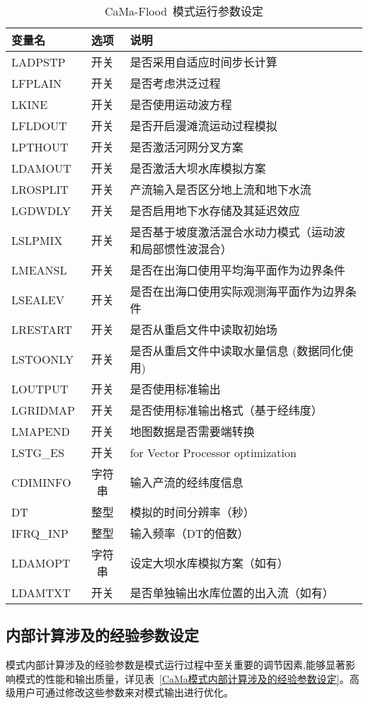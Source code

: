 \documentclass[a4paper,12pt,twoside]{article}
\begin{document}
\begin{table}[htbp]
\caption{CaMa-Flood~模式运行参数设定}
\centering \renewcommand{\arraystretch}{1.5}
\label{模式运行参数设定}
\begin{tabular}{lcl}
\toprule
\textbf{变量名} & \textbf{选项} & \textbf{说明} \\\midrule

LADPSTP & 开关 & 是否采用自适应时间步长计算 \\
LFPLAIN & 开关 & 是否考虑洪泛过程 \\
LKINE & 开关 & 是否使用运动波方程 \\
LFLDOUT & 开关 & 是否开启漫滩流运动过程模拟 \\
LPTHOUT & 开关 & 是否激活河网分叉方案 \\
LDAMOUT & 开关 & 是否激活大坝水库模拟方案 \\
LROSPLIT & 开关 & 产流输入是否区分地上流和地下水流 \\
LGDWDLY & 开关 & 是否启用地下水存储及其延迟效应 \\
LSLPMIX & 开关 &
\makecell[l]{是否基于坡度激活混合水动力模式（运动波\\和局部惯性波混合）} \\
LMEANSL & 开关 & 是否在出海口使用平均海平面作为边界条件 \\
LSEALEV & 开关 & 是否在出海口使用实际观测海平面作为边界条件 \\
LRESTART & 开关 & 是否从重启文件中读取初始场 \\
LSTOONLY & 开关 & 是否从重启文件中读取水量信息 (数据同化使用) \\
LOUTPUT & 开关 & 是否使用标准输出 \\
LGRIDMAP & 开关 & 是否使用标准输出格式（基于经纬度） \\
LMAPEND & 开关 & 地图数据是否需要端转换 \\
LSTG\_ES & 开关 & for Vector Processor optimization \\
CDIMINFO & 字符串 & 输入产流的经纬度信息 \\
DT & 整型 & 模拟的时间分辨率（秒） \\
IFRQ\_INP & 整型 & 输入频率（DT的倍数） \\
LDAMOPT & 字符串 & 设定大坝水库模拟方案（如有） \\
LDAMTXT & 开关 & 是否单独输出水库位置的出入流（如有） \\
\bottomrule
\end{tabular}
\end{table}

\subsection{内部计算涉及的经验参数设定}
模式内部计算涉及的经验参数是模式运行过程中至关重要的调节因素,能够显著影响模式的性能和输出质量，详见表~\ref{CaMa模式内部计算涉及的经验参数设定}。高级用户可通过修改这些参数来对模式输出进行优化。
\end{document}
